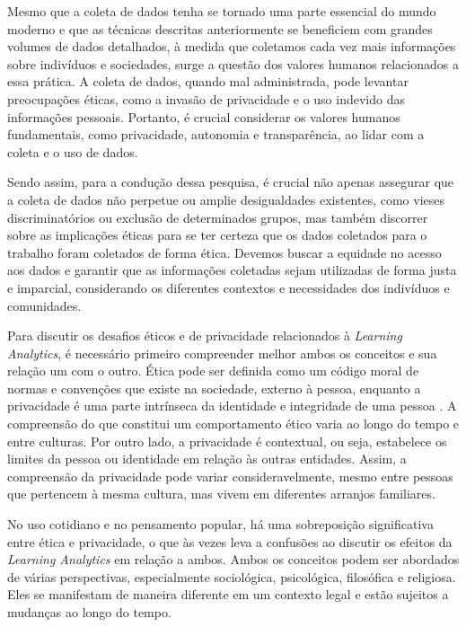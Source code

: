 Mesmo que a coleta de dados %
tenha se tornado uma parte essencial do mundo moderno e que as técnicas descritas anteriormente se %
beneficiem com grandes volumes de dados detalhados, à medida que coletamos cada vez mais informações sobre indivíduos e sociedades, surge a questão dos valores humanos relacionados a essa prática. A coleta de dados, quando mal administrada, pode levantar preocupações éticas, como a invasão de privacidade e o uso indevido das informações pessoais. Portanto, é crucial considerar os valores humanos fundamentais, como privacidade, autonomia e transparência, ao lidar com a coleta e o uso de dados.

Sendo assim, para a condução dessa pesquisa, é crucial não apenas assegurar que a coleta de dados não perpetue ou amplie desigualdades existentes, como vieses discriminatórios ou exclusão de determinados grupos, mas também discorrer sobre as implicações éticas para se ter certeza que os dados coletados para o trabalho foram coletados de forma ética. Devemos buscar a equidade no acesso aos dados e garantir que as informações coletadas sejam utilizadas de forma justa e imparcial, considerando os diferentes contextos e necessidades dos indivíduos e comunidades.


Para discutir os desafios éticos e de privacidade relacionados à \textit{Learning Analytics}, é necessário primeiro compreender melhor ambos os conceitos e sua relação um com o outro. Ética pode ser definida como um código moral de normas e convenções que existe na sociedade, externo à pessoa, enquanto a privacidade é uma parte intrínseca da identidade e integridade de uma pessoa \cite{Drachsler2016}. A compreensão do que constitui um comportamento ético varia ao longo do tempo e entre culturas. Por outro lado, a privacidade é contextual, ou seja, estabelece os limites da pessoa ou identidade em relação às outras entidades. Assim, a compreensão da privacidade pode variar consideravelmente, mesmo entre pessoas que pertencem à mesma cultura, mas vivem em diferentes arranjos familiares.

No uso cotidiano e no pensamento popular, há uma sobreposição significativa entre ética e privacidade, o que às vezes leva a confusões ao discutir os efeitos da \textit{Learning Analytics} em relação a ambos. Ambos os conceitos podem ser abordados de várias perspectivas, especialmente sociológica, psicológica, filosófica e religiosa. Eles se manifestam de maneira diferente em um contexto legal e estão sujeitos a mudanças ao longo do tempo.

